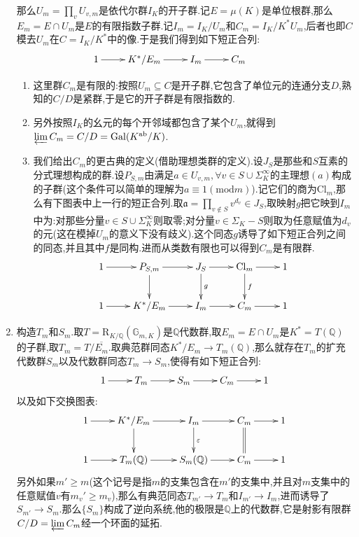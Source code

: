 \begin{enumerate}
\begin{itemize}
    \end{itemize}
    那么$U_m=\prod_vU_{v,m}$是依代尔群$I_K$的开子群.记$E=\mu(K)$是单位根群,那么$E_m=E\cap U_m$是$E$的有限指数子群.记$I_m=I_K/U_m$和$C_m=I_K/K^*U_m$,后者也即$C$模去$U_m$在$C=I_K/K^*$中的像.于是我们得到如下短正合列:
    $$\xymatrix{1\ar[r]&K^*/E_m\ar[r]&I_m\ar[r]&C_m&}$$
    \begin{enumerate}[(1)]
    	\item 这里群$C_m$是有限的:按照$U_m\subseteq C$是开子群,它包含了单位元的连通分支$D$,熟知的$C/D$是紧群,于是它的开子群是有限指数的.
    	\item 另外按照$I_K$的幺元的每个开邻域都包含了某个$U_m$,就得到$\varprojlim C_m=C/D=\mathrm{Gal}(K^{\mathrm{ab}}/K)$.
    	\item 我们给出$C_m$的更古典的定义(借助理想类群的定义).设$J_S$是那些和$S$互素的分式理想构成的群.设$P_{S,m}$由满足$a\in U_{v,m},\forall v\in S\cup\Sigma^{\infty}_K$的主理想$(a)$构成的子群(这个条件可以简单的理解为$a\equiv1(\mathrm{mod}m)$).记它们的商为$\mathrm{Cl}_m$,那么有下图表中上一行的短正合列.取$\mathfrak{a}=\prod_{v\not\in S}v^{d_v}\in J_S$,取映射$g$把它映到$I_m$中为:对那些分量$v\in S\cup\Sigma_K^{\infty}$则取零;对分量$v\in\Sigma_K-S$则取为任意赋值为$d_v$的元(这在模掉$U_m$的意义下没有歧义).这个同态$g$诱导了如下短正合列之间的同态,并且其中$f$是同构.进而从类数有限也可以得到$C_m$是有限群.
    	$$\xymatrix{1\ar[r]&P_{S,m}\ar[d]\ar[r]&J_S\ar[r]\ar[d]^g&\mathrm{Cl}_m\ar[r]\ar[d]^f&1\\1\ar[r]&K^*/E_m\ar[r]&I_m\ar[r]&C_m\ar[r]&1}$$
    \end{enumerate}
    \item 构造$T_m$和$S_m$.取$T=\mathrm{R}_{K/\mathbb{Q}}(\mathbb{G}_{m,K})$是$\mathbb{Q}$代数群,取$E_m=E\cap U_m$是$K^*=T(\mathbb{Q})$的子群,取$T_m=T/\overline{E_m}$.取典范群同态$K^*/E_m\to T_m(\mathbb{Q})$,那么就存在$T_m$的扩充代数群$S_m$以及代数群同态$T_m\to S_m$,使得有如下短正合列:
    $$\xymatrix{1\ar[r]&T_m\ar[r]&S_m\ar[r]&C_m\ar[r]&1}$$
    以及如下交换图表:
    $$\xymatrix{1\ar[r]&K^*/E_m\ar[r]\ar[d]&I_m\ar[r]\ar[d]^{\varepsilon}&C_m\ar[r]\ar@{=}[d]&1\\1\ar[r]&T_m(\mathbb{Q})\ar[r]&S_m(\mathbb{Q})\ar[r]&C_m\ar[r]&1}$$
    另外如果$m'\ge m$(这个记号是指$m$的支集包含在$m'$的支集中,并且对$m$支集中的任意赋值$v$有$m_v'\ge m_v$),那么有典范同态$T_{m'}\to T_m$和$I_{m'}\to I_m$,进而诱导了$S_{m'}\to S_m$.那么$\{S_m\}$构成了逆向系统,他的极限是$\mathbb{Q}$上的代数群,它是射影有限群$C/D=\varprojlim C_m$经一个环面的延拓.
\end{enumerate}
